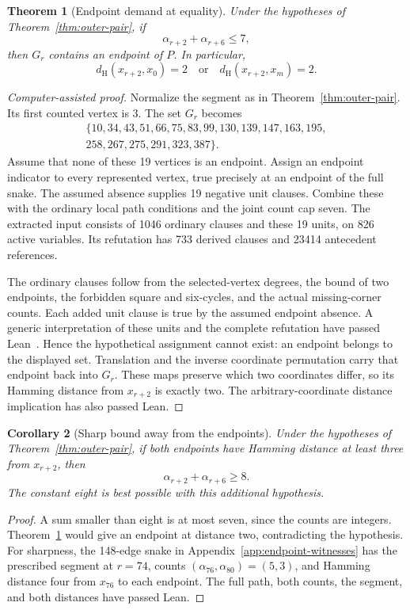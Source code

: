\documentclass[11pt,a4paper]{article}
\newtheorem{theorem}{Theorem}[section]
\newtheorem{corollary}[theorem]{Corollary}
\theoremstyle{definition}
\theoremstyle{remark}
\newcommand{\Ham}{d_{\mathrm H}}
\begin{document}
\begin{theorem}[Endpoint demand at equality]\label{thm:endpoint-demand}
Under the hypotheses of Theorem~\ref{thm:outer-pair}, if
\[
\alpha_{r+2}+\alpha_{r+6}\le7,
\]
then $G_r$ contains an endpoint of $P$. In particular,
\[
\Ham(x_{r+2},x_0)=2\quad\text{or}\quad
\Ham(x_{r+2},x_m)=2.
\]
\end{theorem}
\begin{proof}[Computer-assisted proof]
Normalize the segment as in Theorem~\ref{thm:outer-pair}. Its first counted vertex is 3. The set $G_r$ becomes
\[
\begin{gathered}
\{10,34,43,51,66,75,83,99,130,139,147,163,195,\\
258,267,275,291,323,387\}.
\end{gathered}
\]
Assume that none of these 19 vertices is an endpoint. Assign an endpoint indicator to every represented vertex, true precisely at an endpoint of the full snake. The assumed absence supplies 19 negative unit clauses. Combine these with the ordinary local path conditions and the joint count cap seven. The extracted input consists of 1046 ordinary clauses and these 19 units, on 826 active variables. Its refutation has 733 derived clauses and 23414 antecedent references.

The ordinary clauses follow from the selected-vertex degrees, the bound of two endpoints, the forbidden square and six-cycles, and the actual missing-corner counts. Each added unit clause is true by the assumed endpoint absence. A generic interpretation of these units and the complete refutation have passed Lean~\cite{endpointarchive}. Hence the hypothetical assignment cannot exist: an endpoint belongs to the displayed set. Translation and the inverse coordinate permutation carry that endpoint back into $G_r$. These maps preserve which two coordinates differ, so its Hamming distance from $x_{r+2}$ is exactly two. The arbitrary-coordinate distance implication has also passed Lean.
\end{proof}

\begin{corollary}[Sharp bound away from the endpoints]\label{cor:endpoint-free-pair}
Under the hypotheses of Theorem~\ref{thm:outer-pair}, if both endpoints have Hamming distance at least three from $x_{r+2}$, then
\[
\alpha_{r+2}+\alpha_{r+6}\ge8.
\]
The constant eight is best possible with this additional hypothesis.
\end{corollary}
\begin{proof}
A sum smaller than eight is at most seven, since the counts are integers. Theorem~\ref{thm:endpoint-demand} would give an endpoint at distance two, contradicting the hypothesis. For sharpness, the 148-edge snake in Appendix~\ref{app:endpoint-witnesses} has the prescribed segment at $r=74$, counts $(\alpha_{76},\alpha_{80})=(5,3)$, and Hamming distance four from $x_{76}$ to each endpoint. The full path, both counts, the segment, and both distances have passed Lean.
\end{proof}
\end{document}
